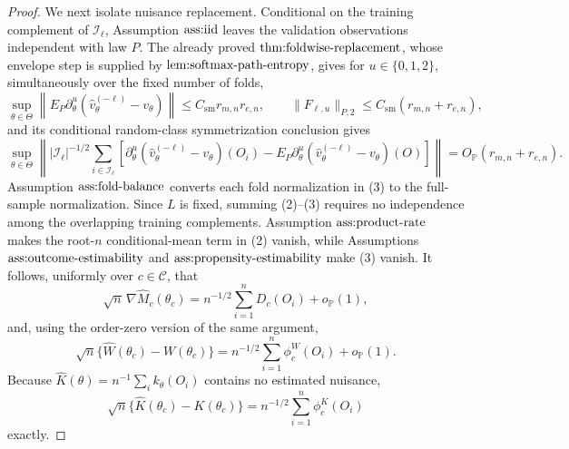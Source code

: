 \documentclass{article}
\begin{document}
\begin{proof}
We next isolate nuisance replacement.  Conditional on the training complement of \(\mathcal I_\ell\), Assumption \(\textnormal{ass:iid}\) leaves the validation observations independent with law \(P\).  The already proved \(\textnormal{thm:foldwise-replacement}\), whose envelope step is supplied by \(\textnormal{lem:softmax-path-entropy}\), gives for \(u\in\{0,1,2\}\), simultaneously over the fixed number of folds,
\[
 \sup_{\theta\in\Theta}\left\|E_P\partial_\theta^u
   (\widehat v_\theta^{(-\ell)}-v_\theta)\right\|
 \le C_{\mathrm{sm}}r_{m,n}r_{e,n},
 \qquad
 \|F_{\ell,u}\|_{P,2}\le
 C_{\mathrm{sm}}(r_{m,n}+r_{e,n}), \tag{2}
\]
and its conditional random-class symmetrization conclusion gives
\[
 \sup_{\theta\in\Theta}\left\|
 |\mathcal I_\ell|^{-1/2}\sum_{i\in\mathcal I_\ell}
 \left[\partial_\theta^u(\widehat v_\theta^{(-\ell)}-v_\theta)(O_i)
 -E_P\partial_\theta^u(\widehat v_\theta^{(-\ell)}-v_\theta)(O)\right]
 \right\|=O_{\mathbb P}(r_{m,n}+r_{e,n}). \tag{3}
\]
Assumption \(\textnormal{ass:fold-balance}\) converts each fold normalization in (3) to the full-sample normalization.  Since \(L\) is fixed, summing (2)--(3) requires no independence among the overlapping training complements.  Assumption \(\textnormal{ass:product-rate}\) makes the root-\(n\) conditional-mean term in (2) vanish, while Assumptions \(\textnormal{ass:outcome-estimability}\) and \(\textnormal{ass:propensity-estimability}\) make (3) vanish.  It follows, uniformly over \(c\in\mathcal C\), that
\[
 \sqrt n\,\nabla\widehat M_c(\theta_c)
 =n^{-1/2}\sum_{i=1}^nD_c(O_i)+o_{\mathbb P}(1), \tag{4}
\]
and, using the order-zero version of the same argument,
\[
 \sqrt n\{\widehat W(\theta_c)-W(\theta_c)\}
 =n^{-1/2}\sum_{i=1}^n\phi_c^W(O_i)+o_{\mathbb P}(1). \tag{5}
\]
Because \(\widehat K(\theta)=n^{-1}\sum_i k_\theta(O_i)\) contains no estimated nuisance,
\[
 \sqrt n\{\widehat K(\theta_c)-K(\theta_c)\}
 =n^{-1/2}\sum_{i=1}^n\phi_c^K(O_i) \tag{6}
\]
exactly.


\end{proof}
\end{document}
